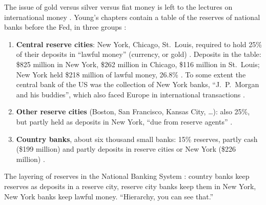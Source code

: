 \begin{paracol}{2}
The issue of gold versus silver versus fiat money is left to the lectures on international money . Young's
chapters contain a table of the reserves of national banks before the Fed, in three groups :
\begin{enumerate}
  \item \textbf{Central reserve cities}: New York, Chicago, St.~Louis, required to hold 25\% of their deposits in ``lawful money''
        (currency, or gold) . Deposits in the table: \$825 million in New York, \$262 million in
        Chicago, \$116 million in St.~Louis; New York held \$218 million of lawful money, 26.8\% . To some extent
        the central bank of the US was the collection of New York banks, ``J.~P.~Morgan and his buddies'', which also faced
        Europe in international transactions .
  \item \textbf{Other reserve cities} (Boston, San Francisco, Kansas City, \dots): also 25\%, but partly held as deposits in New
        York, ``due from reserve agents'' .
  \item \textbf{Country banks}, about six thousand small banks: 15\% reserves, partly cash (\$199 million) and partly deposits in
        reserve cities or New York (\$226 million) .
\end{enumerate}

\begin{nfigure}
\caption{The layering of reserves in the National Banking System : country banks keep reserves as deposits in a
reserve city, reserve city banks keep them in New York, New York banks keep lawful money. ``Hierarchy, you can see that.''}
\label{fig:st-pyramid}
\end{nfigure}


\end{paracol}
